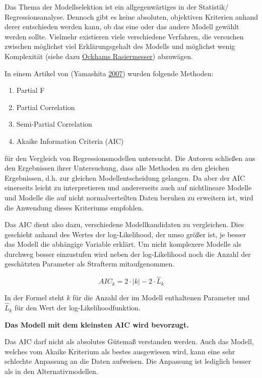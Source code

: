 \documentclass[]{article}
\providecommand{\tightlist}{%
  \setlength{\itemsep}{0pt}\setlength{\parskip}{0pt}}
\begin{document}
Das Thema der Modellselektion ist ein allgegenwärtiges in der Statistik/ Regressionsanalyse. Dennoch gibt es keine absoluten, objektiven Kriterien anhand derer entschieden werden kann, ob das eine oder das andere Modell gewählt werden sollte. Vielmehr existieren viele verschiedene Verfahren, die versuchen zwischen möglichst viel Erklärungsgehalt des Modells und möglichst wenig Komplexität (siehe dazu \href{https://de.wikipedia.org/wiki/Ockhams_Rasiermesser}{Ockhams Rasiermesser}) abzuwägen.

In einem Artikel von (Yamashita \protect\hyperlink{ref-Yamashita.2007}{2007}) wurden folgende Methoden:

\begin{enumerate}
\def\labelenumi{\alph{enumi}.}
\tightlist
\item
  Partial F
\item
  Partial Correlation
\item
  Semi-Partial Correlation
\item
  Akaike Information Criteria (AIC)
\end{enumerate}

für den Vergleich von Regressionsmodellen untersucht. Die Autoren schließen aus den Ergebnissen ihrer Untersuchung, dass alle Methoden zu den gleichen Ergebnissen, d.h. zur gleichen Modellentscheidung gelangen. Da aber der AIC einerseits leicht zu interpretieren und andererseits auch auf nichtlineare Modelle und Modelle die auf nicht normalverteilten Daten beruhen zu erweitern ist, wird die Anwendung dieses Kriteriums empfohlen.

Das AIC dient also dazu, verschiedene Modellkandidaten zu vergleichen. Dies geschieht anhand des Wertes der log-Likelihood, der umso größer ist, je besser das Modell die abhängige Variable erklärt. Um nicht komplexere Modelle als durchweg besser einzustufen wird neben der log-Likelihood noch die Anzahl der geschätzten Parameter als Strafterm mitaufgenommen.

\begin{equation} 
  AIC_k = 2 \cdot |k| - 2\cdot \hat{L}_k
  \label{eq:AIC}
\end{equation}

In der Formel steht \(k\) für die Anzahl der im Modell enthaltenen Parameter und \(\hat{L}_k\) für den Wert der log-Likelihoodfunktion.

\textbf{Das Modell mit dem kleinsten AIC wird bevorzugt.}

Das AIC darf nicht als absolutes Gütemaß verstanden werden. Auch das Modell, welches vom Akaike Kriterium als bestes ausgewiesen wird, kann eine sehr schlechte Anpassung an die Daten aufweisen. Die Anpassung ist lediglich besser als in den Alternativmodellen.
\end{document}
